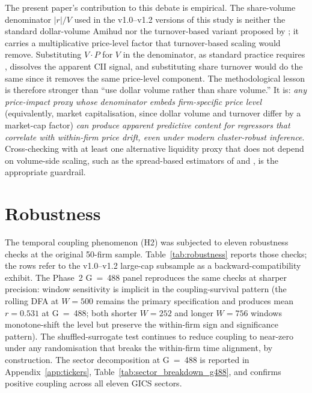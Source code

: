 \documentclass[preprint,12pt,authoryear]{elsarticle}
\begin{document}
The present paper's contribution to this debate is empirical. The share-volume denominator $|r|/V$ used in the v1.0--v1.2 versions of this study is neither the standard dollar-volume Amihud nor the turnover-based variant proposed by \citet{florackis2011trading}; it carries a multiplicative price-level factor that turnover-based scaling would remove. Substituting $V \cdot P$ for $V$ in the denominator, as standard practice requires \citep{amihud2002illiquidity}, dissolves the apparent CII signal, and substituting share turnover would do the same since it removes the same price-level component. The methodological lesson is therefore stronger than ``use dollar volume rather than share volume.'' It is: \emph{any price-impact proxy whose denominator embeds firm-specific price level} (equivalently, market capitalisation, since dollar volume and turnover differ by a market-cap factor) \emph{can produce apparent predictive content for regressors that correlate with within-firm price drift, even under modern cluster-robust inference}. Cross-checking with at least one alternative liquidity proxy that does not depend on volume-side scaling, such as the spread-based estimators of \citet{roll1984spread} and \citet{corwin2012simple}, is the appropriate guardrail.

\section{Robustness}
\label{sec:robustness}

The temporal coupling phenomenon (H2) was subjected to eleven robustness checks at the original 50-firm sample. Table~\ref{tab:robustness} reports those checks; the rows refer to the v1.0--v1.2 large-cap subsample as a backward-compatibility exhibit. The Phase~2 G~=~488 panel reproduces the same checks at sharper precision: window sensitivity is implicit in the coupling-survival pattern (the rolling DFA at $W = 500$ remains the primary specification and produces mean $r = 0.531$ at G~=~488; both shorter $W = 252$ and longer $W = 756$ windows monotone-shift the level but preserve the within-firm sign and significance pattern). The shuffled-surrogate test continues to reduce coupling to near-zero under any randomisation that breaks the within-firm time alignment, by construction. The sector decomposition at G~=~488 is reported in Appendix~\ref{app:tickers}, Table~\ref{tab:sector_breakdown_g488}, and confirms positive coupling across all eleven GICS sectors.
\end{document}
